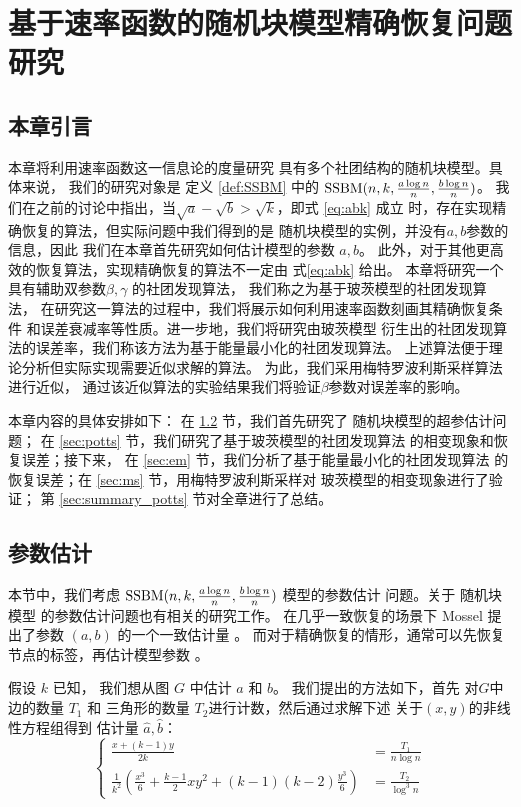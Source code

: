 
\chapter{基于速率函数的随机块模型精确恢复问题研究}\label{chap:sibm}
\section{本章引言}
本章将利用速率函数这一信息论的度量研究
具有多个社团结构的随机块模型。具体来说，
我们的研究对象是
定义 \ref{def:SSBM} 中的 $\operatorname{SSBM}(n,k,\frac{a \log n}{n}, \frac{b \log n}{n})$。
我们在之前的讨论中指出，当$\sqrt{a}-\sqrt{b}>\sqrt{k}$，即式 \eqref{eq:abk} 成立
时，存在实现精确恢复的算法，但实际问题中我们得到的是
随机块模型的实例，并没有$a,b$参数的信息，因此
我们在本章首先研究如何估计模型的参数 $a,b$。
此外，对于其他更高效的恢复算法，实现精确恢复的算法不一定由 式\eqref{eq:abk}
给出。
本章将研究一个具有辅助双参数$\beta,\gamma$ 的社团发现算法，
我们称之为基于玻茨模型的社团发现算法，
在研究这一算法的过程中，我们将展示如何利用速率函数刻画其精确恢复条件
和误差衰减率等性质。进一步地，我们将研究由玻茨模型
衍生出的社团发现算法的误差率，我们称该方法为基于能量最小化的社团发现算法。
上述算法便于理论分析但实际实现需要近似求解的算法。
为此，我们采用梅特罗波利斯采样算法进行近似，
通过该近似算法的实验结果我们将验证$\beta$参数对误差率的影响。

本章内容的具体安排如下：
在 \ref{sec:parameter_estimation} 节，我们首先研究了
随机块模型的超参估计问题；
在 \ref{sec:potts} 节，我们研究了基于玻茨模型的社团发现算法
的相变现象和恢复误差；接下来，
在 \ref{sec:em} 节，我们分析了基于能量最小化的社团发现算法
的恢复误差；在 \ref{sec:ms} 节，用梅特罗波利斯采样对
玻茨模型的相变现象进行了验证；
第 \ref{sec:summary_potts} 节对全章进行了总结。
\section{参数估计}\label{sec:parameter_estimation}


本节中，我们考虑 $\operatorname{SSBM}(n,k,\frac{a \log n}{n}, \frac{b \log n}{n})$ 模型的参数估计
问题。关于 随机块模型 的参数估计问题也有相关的研究工作。
在几乎一致恢复的场景下 Mossel 提出了参数 $(a,b)$ 的一个一致估计量
\cite{mossel2015reconstruction}。
而对于精确恢复的情形，通常可以先恢复节点的标签，再估计模型参数
\cite{abbe2015recovering}。

假设 $k$ 已知，
我们想从图 $G$ 中估计
$a$ 和 $b$。
我们提出的方法如下，首先
对$G$中 边的数量 $T_1$ 
和 三角形的数量
$T_2$进行计数，然后通过求解下述
关于$(x,y)$的非线性方程组得到
估计量 $\hat{a}, \hat{b}$：
\begin{equation} \label{eq:e_1}
\left\{
	\begin{alignedat}{1}
	\frac{x+(k-1)y}{2k}  &= \frac{T_1}{n\log n} \\
\frac{1}{k^2}
\left(\frac{x^3}{6} + \frac{k-1}{2}xy^2 + (k-1)(k-2)\frac{y^3}{6}\right)
 &= \frac{T_2}{\log^3 n}
	\end{alignedat}
\right.
\end{equation}


